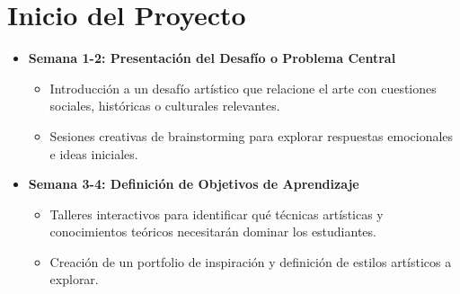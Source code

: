 \section{Inicio del Proyecto}

\begin{itemize}
  \item \textbf{Semana 1-2: Presentación del Desafío o Problema Central}
  \begin{itemize}
    \item Introducción a un desafío artístico que relacione el arte con cuestiones sociales, históricas o culturales relevantes.
    \item Sesiones creativas de brainstorming para explorar respuestas emocionales e ideas iniciales.
  \end{itemize}
  \item \textbf{Semana 3-4: Definición de Objetivos de Aprendizaje}
  \begin{itemize}
    \item Talleres interactivos para identificar qué técnicas artísticas y conocimientos teóricos necesitarán dominar los estudiantes.
    \item Creación de un portfolio de inspiración y definición de estilos artísticos a explorar.
  \end{itemize}
\end{itemize}

